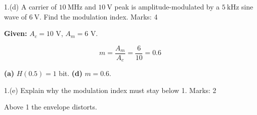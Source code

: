 \label{sec:d_am_problem}

\begin{questionblock}[(d) AM Problem]{1.(d) A carrier of $10~\text{MHz}$ and $10~\text{V}$ peak is amplitude-modulated by a $5~\text{kHz}$ sine wave of $6~\text{V}$. Find the modulation index. Marks: 4}

\answer

\textbf{Given:} $A_c = 10$ V, $A_m = 6$ V.

\[
    m = \frac{A_m}{A_c} = \frac{6}{10} = 0.6
\]

\answersummary

\textbf{(a)} $H(0.5) = 1$ bit. \textbf{(d)} $m = 0.6$.

\end{questionblock}

\label{sec:1e_a_part_missing_from_the_paper_list}

\begin{questionblock}{1.(e) Explain why the modulation index must stay below 1. Marks: 2}

\answer

Above 1 the envelope distorts.

\end{questionblock}

